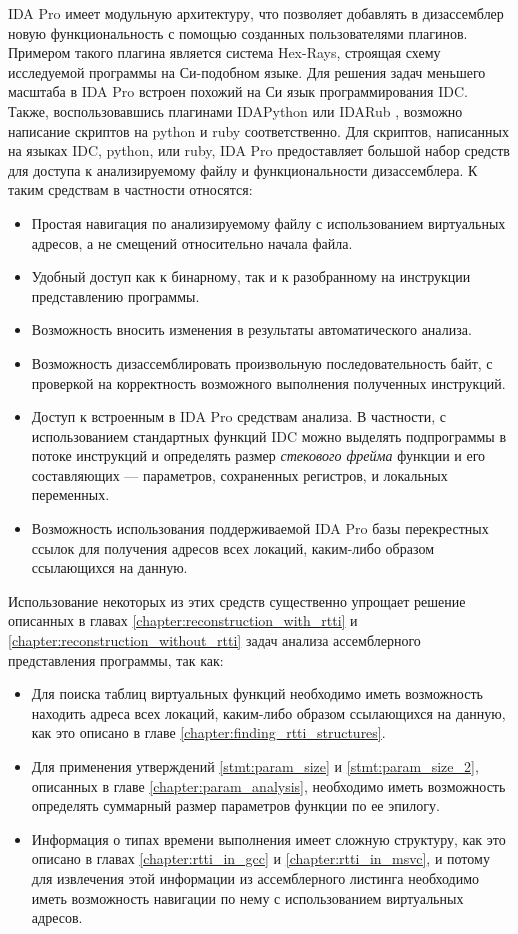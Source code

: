 IDA Pro имеет модульную архитектуру, что позволяет добавлять в дизассемблер новую функциональность с помощью созданных пользователями плагинов. Примером такого плагина является система Hex-Rays, строящая схему исследуемой программы на Си-подобном языке. Для решения задач меньшего масштаба в IDA Pro встроен похожий на Си язык программирования IDC. Также, воспользовавшись плагинами IDAPython \cite{idapython} или IDARub \cite{idarub}, возможно написание скриптов на python и ruby соответственно. Для скриптов, написанных на языках IDC, python, или ruby, IDA Pro предоставляет большой набор средств для доступа к анализируемому файлу и функциональности дизассемблера. К таким средствам в частности относятся:

\begin{itemize}
\item Простая навигация по анализируемому файлу с использованием виртуальных адресов, а не смещений относительно начала файла.
\item Удобный доступ как к бинарному, так и к разобранному на инструкции представлению программы.
\item Возможность вносить изменения в результаты автоматического анализа.
\item Возможность дизассемблировать произвольную последовательность байт, с проверкой на корректность возможного выполнения полученных инструкций.
\item Доступ к встроенным в IDA Pro средствам анализа. В частности, с использованием стандартных функций IDC можно выделять подпрограммы в потоке инструкций и определять размер {\it стекового фрейма} функции и его составляющих --- параметров, сохраненных регистров, и локальных переменных.
\item Возможность использования поддерживаемой IDA Pro базы перекрестных ссылок для получения адресов всех локаций, каким-либо образом ссылающихся на данную.
\end{itemize}

Использование некоторых из этих средств существенно упрощает решение описанных в главах \ref{chapter:reconstruction_with_rtti} и \ref{chapter:reconstruction_without_rtti} задач анализа ассемблерного представления программы, так как:
\begin{itemize}
\item Для поиска таблиц виртуальных функций необходимо иметь возможность находить адреса всех локаций, каким-либо образом ссылающихся на данную, как это описано в главе \ref{chapter:finding_rtti_structures}.
\item Для применения утверждений \ref{stmt:param_size} и \ref{stmt:param_size_2}, описанных в главе \ref{chapter:param_analysis}, необходимо иметь возможность определять суммарный размер параметров функции по ее эпилогу.
\item Информация о типах времени выполнения имеет сложную структуру, как это описано в главах \ref{chapter:rtti_in_gcc} и \ref{chapter:rtti_in_msvc}, и потому для извлечения этой информации из ассемблерного листинга необходимо иметь возможность навигации по нему с использованием виртуальных адресов.
\end{itemize}

